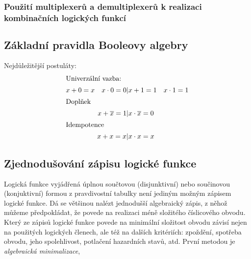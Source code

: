 {      \subsubsection{Použití multiplexerů a demultiplexerů k realizaci kombinačních logických funkcí}
   
  \subsection{Základní pravidla Booleovy algebry}\label{CES:basic_bool_alg}
    Nejdůležitější postuláty:
    \begin{align}
       \shortintertext{Univerzální vazba:}
         x + 0 = x \quad x\cdot 0 = 0 &|  x + 1 = 1 \quad x\cdot 1 = 1                         \\
       \shortintertext{Doplňek}
         x + \overline{x} = 1         &|  x\cdot\overline{x} = 0                               \\
       \shortintertext{Idempotence}
         x +x = x                     &|  x\cdot x = x      
      \label{CES:postul_Idemp}
    \end{align}
  \subsection{Zjednodušování zápisu logické funkce}
     Logická funkce vyjádřená úplnou součtovou (disjunktivní) nebo součinovou (konjuktivní) formou 
     z pravdivostní tabulky není jediným možným zápisem logické funkce. Dá se většinou nalézt 
     jednodušší algebraický zápis, z něhož můžeme předpokládat, že povede na realizaci méně 
     složitého číslicového obvodu. Který ze zápisů logické funkce povede na minimální složitost 
     obvodu závisí nejen na použitých logických členech, ale též na dalších kritériích: zpoždění, 
     spotřeba obvodu, jeho spolehlivost, potlačení hazardních stavů, atd. První metodou je 
     \emph{algebraická minimalizace}, 
     
}
